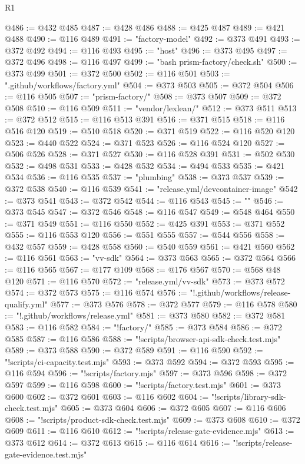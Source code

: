 \begin{lexlean}{R1}
\begin{coremodule}
@486 := @432 @485
@487 := @428 @486
@488 := @425 @487
@489 := @421 @488
@490 := @116 @489
@491 := "factory-model"
@492 := @373 @491
@493 := @372 @492
@494 := @116 @493
@495 := "host"
@496 := @373 @495
@497 := @372 @496
@498 := @116 @497
@499 := "bash prism-factory/check.sh"
@500 := @373 @499
@501 := @372 @500
@502 := @116 @501
@503 := ".github/workflows/factory.yml"
@504 := @373 @503
@505 := @372 @504
@506 := @116 @505
@507 := "prism-factory/"
@508 := @373 @507
@509 := @372 @508
@510 := @116 @509
@511 := "vendor/lexlean/"
@512 := @373 @511
@513 := @372 @512
@515 := @116 @513 @391
@516 := @371 @515
@518 := @116 @516 @120
@519 := @510 @518
@520 := @371 @519
@522 := @116 @520 @120
@523 := @440 @522
@524 := @371 @523
@526 := @116 @524 @120
@527 := @506 @526
@528 := @371 @527
@530 := @116 @528 @391
@531 := @502 @530
@532 := @498 @531
@533 := @428 @532
@534 := @494 @533
@535 := @421 @534
@536 := @116 @535
@537 := "plumbing"
@538 := @373 @537
@539 := @372 @538
@540 := @116 @539
@541 := "release.yml/devcontainer-image"
@542 := @373 @541
@543 := @372 @542
@544 := @116 @543
@545 := ""
@546 := @373 @545
@547 := @372 @546
@548 := @116 @547
@549 := @548 @464
@550 := @371 @549
@551 := @116 @550
@552 := @425 @391
@553 := @371 @552
@555 := @116 @553 @120
@556 := @551 @555
@557 := @544 @556
@558 := @432 @557
@559 := @428 @558
@560 := @540 @559
@561 := @421 @560
@562 := @116 @561
@563 := "vv-sdk"
@564 := @373 @563
@565 := @372 @564
@566 := @116 @565
@567 := @177 @109
@568 := @176 @567
@570 := @568 @48 @120
@571 := @116 @570
@572 := "release.yml/vv-sdk"
@573 := @373 @572
@574 := @372 @573
@575 := @116 @574
@576 := "!.github/workflows/release-qualify.yml"
@577 := @373 @576
@578 := @372 @577
@579 := @116 @578
@580 := "!.github/workflows/release.yml"
@581 := @373 @580
@582 := @372 @581
@583 := @116 @582
@584 := "!factory/"
@585 := @373 @584
@586 := @372 @585
@587 := @116 @586
@588 := "!scripts/browser-api-sdk-check.test.mjs"
@589 := @373 @588
@590 := @372 @589
@591 := @116 @590
@592 := "!scripts/ci-capacity.test.mjs"
@593 := @373 @592
@594 := @372 @593
@595 := @116 @594
@596 := "!scripts/factory.mjs"
@597 := @373 @596
@598 := @372 @597
@599 := @116 @598
@600 := "!scripts/factory.test.mjs"
@601 := @373 @600
@602 := @372 @601
@603 := @116 @602
@604 := "!scripts/library-sdk-check.test.mjs"
@605 := @373 @604
@606 := @372 @605
@607 := @116 @606
@608 := "!scripts/product-sdk-check.test.mjs"
@609 := @373 @608
@610 := @372 @609
@611 := @116 @610
@612 := "!scripts/release-gate-evidence.mjs"
@613 := @373 @612
@614 := @372 @613
@615 := @116 @614
@616 := "!scripts/release-gate-evidence.test.mjs"

\end{coremodule}
\end{lexlean}
